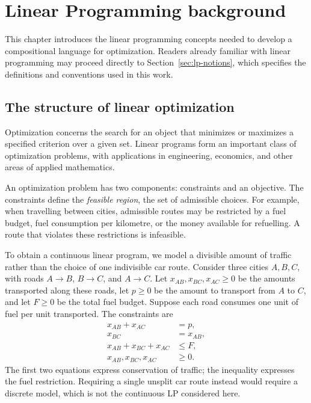 \chapter{Linear Programming background}\label{chap:lp-background}
This chapter introduces the linear programming concepts needed to develop a
compositional language for optimization. Readers already familiar with linear
programming may proceed directly to Section~\ref{sec:lp-notions}, which specifies
the definitions and conventions used in this work.

\section{The structure of linear optimization}

Optimization concerns the search for an object that minimizes or maximizes a
specified criterion over a given set. Linear programs form an important class
of optimization problems, with applications in engineering, economics, and
other areas of applied mathematics.

An optimization problem has two components: constraints and an objective.
The constraints define the \emph{feasible region}, the set of admissible choices.
For example, when travelling between cities, admissible routes may be restricted
by a fuel budget, fuel consumption per kilometre, or the money available for
refuelling. A route that violates these restrictions is infeasible.

To obtain a continuous linear program, we model a divisible amount of traffic
rather than the choice of one indivisible car route. Consider three cities
$A,B,C$, with roads $A\to B$, $B\to C$, and $A\to C$. Let
$x_{AB},x_{BC},x_{AC}\ge0$ be the amounts transported along these roads,
let $p\ge0$ be the amount to transport from $A$ to $C$, and let $F\ge0$
be the total fuel budget. Suppose each road consumes one unit of fuel per
unit transported. The constraints are
\[
\begin{aligned}
x_{AB}+x_{AC}&=p,\\
x_{BC}&=x_{AB},\\
x_{AB}+x_{BC}+x_{AC}&\le F,\\
x_{AB},x_{BC},x_{AC}&\ge0.
\end{aligned}
\]
The first two equations express conservation of traffic; the inequality
expresses the fuel restriction. Requiring a single unsplit car route instead
would require a discrete model, which is not the continuous LP considered here.

